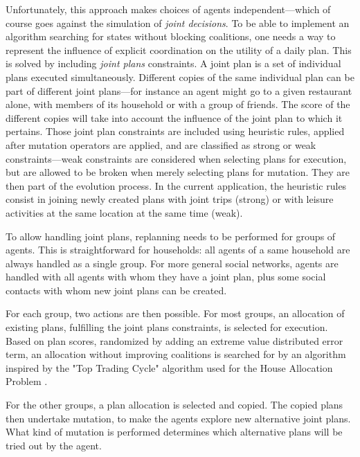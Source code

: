 {Unfortunately, this approach makes choices of agents independent---which of course goes against the simulation of \emph{joint decisions}. To be able to implement an algorithm searching for states without
blocking coalitions, one needs a way to represent the influence of explicit coordination on the utility of a daily plan. This is solved by including \emph{joint plans} constraints. A joint plan is a set of
individual plans executed simultaneously. Different copies of the same individual plan can be part of different joint plans---for instance an agent might go to a given restaurant alone, with members of its
household or with a group of friends. The score of the different copies will take into account the influence of the joint plan to which it pertains. Those joint plan constraints are included using heuristic
rules, applied after mutation operators are applied, and are classified as strong or weak constraints---weak constraints are considered when selecting plans for execution, but are allowed to be broken when merely selecting plans for mutation. They are then part of the evolution process. In the current application, the heuristic rules consist in joining newly created plans with joint trips (strong) or with leisure activities at the same location at the same time (weak).

To allow handling joint plans, replanning needs to be performed for groups of agents. This is straightforward for households: all agents of a same household are always handled as a single group. For more general social networks, agents are handled with all agents with whom they have a joint plan, plus some social contacts with whom new joint plans can be created.

For each group, two actions are then possible. For most groups, an allocation of existing plans, fulfilling the joint plans constraints, is selected for execution. Based on plan scores, randomized by adding an extreme value distributed error term, an allocation without improving coalitions is searched for by an algorithm inspired by the "Top Trading Cycle" algorithm used for the House Allocation Problem \citep{SchummerVohra_NisanEtAl_2007}.

For the other groups, a plan allocation is selected and copied. The copied plans then undertake mutation, to make the agents explore new alternative joint plans. What kind of mutation is performed  determines which alternative plans will be tried out by the agent.

}
